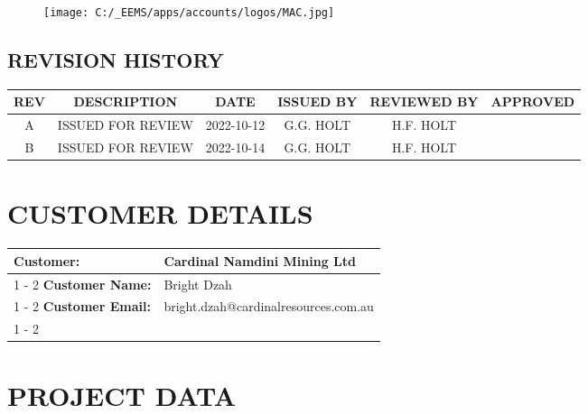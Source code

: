 \documentclass{article}%
\begin{document}
\begin{figure}[h!]%
\texttt{[image: C:/\_EEMS/apps/accounts/logos/MAC.jpg]}%
\centering%
\end{figure}

%
\newpage%
\begin{center}%
\section*{REVISION HISTORY}%
\label{sec:REVISIONHISTORY}%

%
\begin{minipage}{\textwidth}%
\centering%
\begin{tabular}{|c |c |c |c |c |c |}%
\hline%
\textbf{REV}&\textbf{DESCRIPTION}&\textbf{DATE}&\textbf{ISSUED BY}&\textbf{REVIEWED BY}&\textbf{APPROVED}\\%
\hline%
A&ISSUED FOR REVIEW&2022{-}10{-}12&G.G. HOLT&H.F. HOLT&\\%
\hline%
B&ISSUED FOR REVIEW&2022{-}10{-}14&G.G. HOLT&H.F. HOLT&\\%
\hline%
\end{tabular}%
\end{minipage}%
\end{center}%
\newpage%
\section{CUSTOMER DETAILS}%
\label{sec:CUSTOMERDETAILS}%
\begin{flushleft}%
\begin{minipage}{\textwidth}%
\centering%
\begin{tabular}{|l |l |}%
\hline%
\textbf{Customer:}&Cardinal Namdini Mining Ltd\\%
\cline{1%
-%
2}%
\textbf{Customer Name:}&Bright Dzah\\%
\cline{1%
-%
2}%
\textbf{Customer Email:}&bright.dzah@cardinalresources.com.au\\%
\cline{1%
-%
2}%
\end{tabular}%
\end{minipage}%
\end{flushleft}

%
\newpage%
\section{PROJECT DATA}%
\label{sec:PROJECTDATA}%
\end{document}
